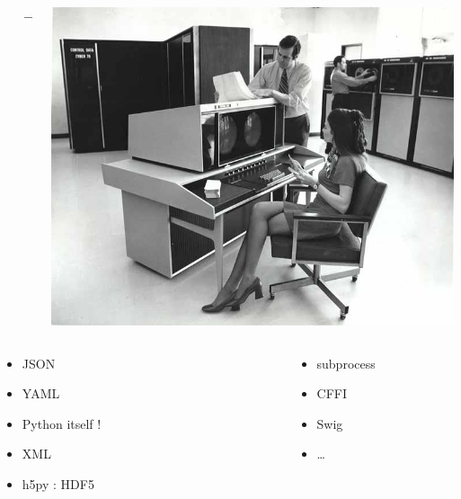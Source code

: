 \begin{frame}
\begin{columns}
\begin{column}{.3\textwidth}
    \end{column}
    \begin{column}{.05\textwidth}
      \centerline{$\longrightarrow$}
    \end{column}
    \begin{column}{.3\textwidth}
      \begin{center}
        \includegraphics[width=.9\textwidth]{images/mainframe-console.jpg}
      \end{center}
    \end{column}
  \end{columns}
  \begin{columns}[t]
  \fontsize{8pt}{8pt}\selectfont
    \begin{column}{.3\textwidth}
      \begin{itemize}
      \item JSON
      \item YAML
      \item Python itself !
      \item XML
      \item h5py : HDF5
      \end{itemize}
    \end{column}
    \begin{column}{.05\textwidth}
    \end{column}
    \begin{column}{.3\textwidth}
      \begin{itemize}
      \item subprocess
      \item CFFI
      \item Swig
      \item \ldots

\end{itemize}
\end{column}
\end{columns}
\end{frame}
